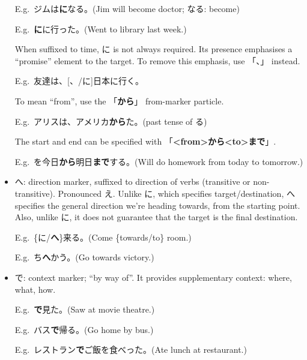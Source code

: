 \documentclass[../nihongo-gakushuu-kyouzai.tex]{subfiles}
\begin{document}
\begin{itemize}
    E.g.\ ジムは\textbf{に}なる。(Jim will become doctor; なる: become)

    E.g.\ \textbf{に}に行った。(Went to library last week.)

    When suffixed to time, に is not always required. Its presence emphasises a ``promise'' element to the target. To remove this emphasis, use 「、」 instead.

    E.g.\ 友達は、[、/に]日本に行く。

    To mean ``from'', use the 「\textbf{から}」 from-marker particle.

    E.g.\ アリスは、アメリカ\textbf{から}た。(past tense of る)

    The start and end can be specified with 「\textbf{<from>から<to>まで}」.

    E.g.\ を今日\textbf{から}明日\textbf{まで}する。(Will do homework from today to tomorrow.)

    \item へ: direction marker, suffixed to direction of verbs (transitive or non-transitive). Pronounced え. Unlike に, which specifies target/destination, へ specifies the general direction we're heading towards, from the starting point. Also, unlike に, it does not guarantee that the target is the final destination. 

    E.g.\ \{に/\textbf{へ}\}来る。(Come \{towards/to\} room.)

    E.g.\ ち\textbf{へ}かう。(Go towards victory.)
    \item で: context marker; ``by way of''. It provides supplementary context: where, what, how.

    E.g.\ \textbf{で}見た。(Saw at movie theatre.)

    E.g.\ バス\textbf{で}帰る。(Go home by bus.)

    E.g.\ レストラン\textbf{で}ご飯を食べった。(Ate lunch at restaurant.)
\end{itemize}
\end{document}
